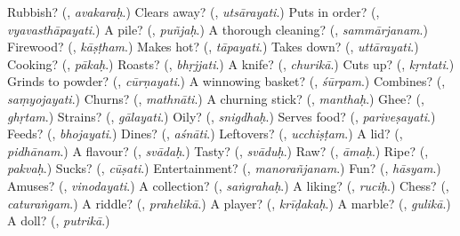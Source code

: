 \begin{tcolorbox}[breakable,colback=teal!4,colframe=teal!35!black,title={Before you move on}]
Rubbish? (\textbf{}, \emph{avakaraḥ}.) Clears away? (\textbf{}, \emph{utsārayati}.) Puts in order? (\textbf{}, \emph{vyavasthāpayati}.) A pile? (\textbf{}, \emph{puñjaḥ}.) A thorough cleaning? (\textbf{}, \emph{sammārjanam}.) Firewood? (\textbf{}, \emph{kāṣṭham}.) Makes hot? (\textbf{}, \emph{tāpayati}.) Takes down? (\textbf{}, \emph{uttārayati}.) Cooking? (\textbf{}, \emph{pākaḥ}.) Roasts? (\textbf{}, \emph{bhṛjjati}.) A knife? (\textbf{}, \emph{churikā}.) Cuts up? (\textbf{}, \emph{kṛntati}.) Grinds to powder? (\textbf{}, \emph{cūrṇayati}.) A winnowing basket? (\textbf{}, \emph{śūrpam}.) Combines? (\textbf{}, \emph{saṃyojayati}.) Churns? (\textbf{}, \emph{mathnāti}.) A churning stick? (\textbf{}, \emph{manthaḥ}.) Ghee? (\textbf{}, \emph{ghṛtam}.) Strains? (\textbf{}, \emph{gālayati}.) Oily? (\textbf{}, \emph{snigdhaḥ}.) Serves food? (\textbf{}, \emph{pariveṣayati}.) Feeds? (\textbf{}, \emph{bhojayati}.) Dines? (\textbf{}, \emph{aśnāti}.) Leftovers? (\textbf{}, \emph{ucchiṣṭam}.) A lid? (\textbf{}, \emph{pidhānam}.) A flavour? (\textbf{}, \emph{svādaḥ}.) Tasty? (\textbf{}, \emph{svāduḥ}.) Raw? (\textbf{}, \emph{āmaḥ}.) Ripe? (\textbf{}, \emph{pakvaḥ}.) Sucks? (\textbf{}, \emph{cūṣati}.) Entertainment? (\textbf{}, \emph{manorañjanam}.) Fun? (\textbf{}, \emph{hāsyam}.) Amuses? (\textbf{}, \emph{vinodayati}.) A collection? (\textbf{}, \emph{saṅgrahaḥ}.) A liking? (\textbf{}, \emph{ruciḥ}.) Chess? (\textbf{}, \emph{caturaṅgam}.) A riddle? (\textbf{}, \emph{prahelikā}.) A player? (\textbf{}, \emph{krīḍakaḥ}.) A marble? (\textbf{}, \emph{gulikā}.) A doll? (\textbf{}, \emph{putrikā}.)
\end{tcolorbox}
